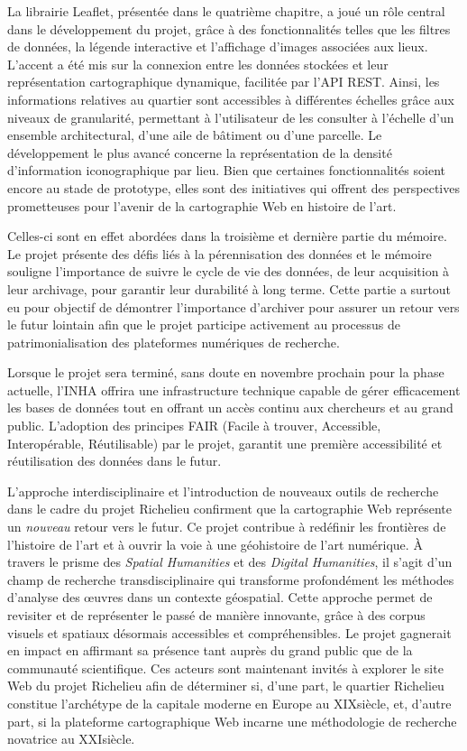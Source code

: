 La librairie Leaflet, présentée dans le quatrième chapitre, a joué un rôle central dans le développement du projet, grâce à des fonctionnalités telles que les filtres de données, la légende interactive et l'affichage d'images associées aux lieux. L'accent a été mis sur la connexion entre les données stockées et leur représentation cartographique dynamique, facilitée par l'API REST. Ainsi, les informations relatives au quartier sont accessibles à différentes échelles grâce aux niveaux de granularité, permettant à l'utilisateur de les consulter à l'échelle d'un ensemble architectural, d'une aile de bâtiment ou d’une parcelle. Le développement le plus avancé concerne la représentation de la densité d'information iconographique par lieu. Bien que certaines fonctionnalités soient encore au stade de prototype, elles sont des initiatives qui offrent des perspectives prometteuses pour l'avenir de la cartographie Web en histoire de l'art.

Celles-ci sont en effet abordées dans la troisième et dernière partie du mémoire. Le projet présente des défis liés à la pérennisation des données et le mémoire souligne l’importance de suivre le cycle de vie des données, de leur acquisition à leur archivage, pour garantir leur durabilité à long terme. Cette partie a surtout eu pour objectif de démontrer l'importance d'archiver pour assurer un retour vers le futur lointain afin que le projet participe activement au processus de patrimonialisation des plateformes numériques de recherche. 

Lorsque le projet sera terminé, sans doute en novembre prochain pour la phase actuelle, l'INHA offrira  une infrastructure technique capable de gérer efficacement les bases de données tout en offrant un accès continu aux chercheurs et au grand public. L'adoption des principes FAIR (Facile à trouver, Accessible, Interopérable, Réutilisable) par le projet,  garantit une première accessibilité et réutilisation des données dans le futur. 

L'approche interdisciplinaire et l'introduction de nouveaux outils de recherche dans le cadre du projet Richelieu confirment que la cartographie Web représente un \textit{nouveau} retour vers le futur. Ce projet contribue à redéfinir les frontières de l'histoire de l'art et à ouvrir la voie à une géohistoire de l'art numérique. À travers le prisme des \textit{Spatial Humanities} et des \textit{Digital Humanities}, il s'agit d'un champ de recherche transdisciplinaire qui transforme profondément les méthodes d'analyse des œuvres dans un contexte géospatial. Cette approche permet de revisiter et de représenter le passé de manière innovante, grâce à des corpus visuels et spatiaux désormais accessibles et compréhensibles. Le projet gagnerait en impact en affirmant sa présence tant auprès du grand public que de la communauté scientifique. Ces acteurs sont maintenant invités à explorer le site Web du projet Richelieu afin de déterminer si, d'une part, le quartier Richelieu constitue l'archétype de la capitale moderne en Europe au XIX\ieme siècle, et, d'autre part, si la plateforme cartographique Web incarne une méthodologie de recherche novatrice au XXI\ieme  siècle.

